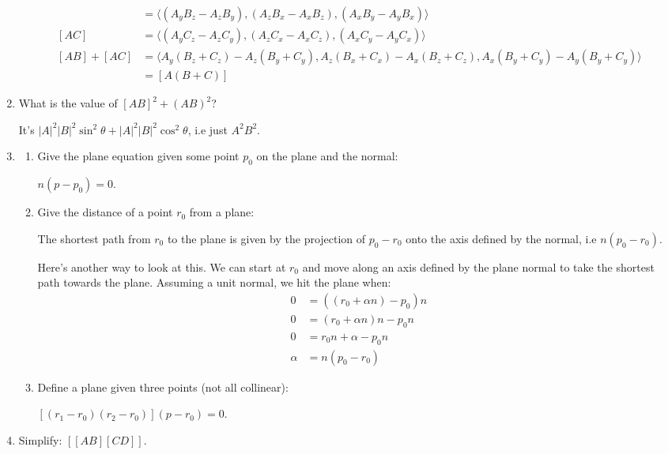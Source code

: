 \documentclass{article}
\newcommand{\tuple}[1]{\langle #1 \rangle}
\begin{document}
\begin{enumerate}[1)]
        \begin{align*}
            [AB] &= \tuple{(A_yB_z - A_zB_y), (A_zB_x - A_xB_z), (A_xB_y -
            A_yB_x)} \\
            [AC] &= \tuple{(A_yC_z - A_zC_y), (A_zC_x - A_xC_z), (A_xC_y -
            A_yC_x)} \\
            [AB] + [AC] &= \tuple{A_y(B_z+C_z) - A_z(B_y+C_y),
                                  A_z(B_x+C_x) - A_x(B_z+C_z),
                                  A_x(B_y+C_y) - A_y(B_y+C_y)} \\
                        &= [A(B+C)]
        \end{align*}
    \item What is the value of $[AB]^2 + (AB)^2$?

        It's $|A|^2|B|^2\sin^2\theta + |A|^2|B|^2\cos^2\theta$, i.e just
        $A^2B^2$.

    \item
        \begin{enumerate}
            \item Give the plane equation given some point $p_0$ on the
                plane and the normal:

                $n(p - p_0) = 0$.
            \item Give the distance of a point $r_0$ from a plane:

                The shortest path from $r_0$ to the plane is given by the
                projection of $p_0 - r_0$ onto the axis defined by the
                normal, i.e $n(p_0 - r_0)$.

                Here's another way to look at this. We can start at $r_0$
                and move along an axis defined by the plane normal to take the
                shortest path towards the plane. Assuming a unit normal, we hit
                the plane when:
                \begin{align*}
                    0 &= ((r_0 + \alpha n) - p_0)n \\
                    0 &= (r_0 + \alpha n)n - p_0n \\
                    0 &= r_0n + \alpha - p_0n \\
                    \alpha &= n(p_0 - r_0)
                \end{align*}
            \item Define a plane given three points (not all collinear):

                $[(r_1 - r_0)(r_2 - r_0)](p - r_0) = 0$.
        \end{enumerate}
    \item Simplify: $[[AB][CD]]$.


\end{enumerate}
\end{document}
